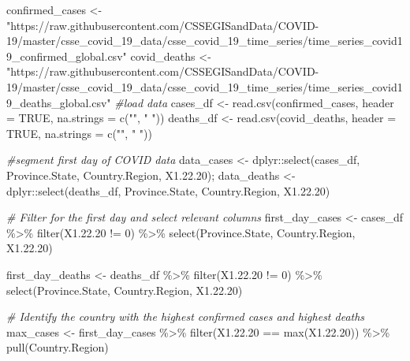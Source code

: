 \documentclass[
]{article}
\newenvironment{Shaded}{\begin{snugshade}}{\end{snugshade}}
\newcommand{\AttributeTok}[1]{\textcolor[rgb]{0.77,0.63,0.00}{#1}}
\newcommand{\CommentTok}[1]{\textcolor[rgb]{0.56,0.35,0.01}{\textit{#1}}}
\newcommand{\ConstantTok}[1]{\textcolor[rgb]{0.00,0.00,0.00}{#1}}
\newcommand{\DecValTok}[1]{\textcolor[rgb]{0.00,0.00,0.81}{#1}}
\newcommand{\FloatTok}[1]{\textcolor[rgb]{0.00,0.00,0.81}{#1}}
\newcommand{\FunctionTok}[1]{\textcolor[rgb]{0.00,0.00,0.00}{#1}}
\newcommand{\NormalTok}[1]{#1}
\newcommand{\OtherTok}[1]{\textcolor[rgb]{0.56,0.35,0.01}{#1}}
\newcommand{\SpecialCharTok}[1]{\textcolor[rgb]{0.00,0.00,0.00}{#1}}
\newcommand{\StringTok}[1]{\textcolor[rgb]{0.31,0.60,0.02}{#1}}
\begin{document}
\begin{Shaded}
\begin{Highlighting}[]
\NormalTok{confirmed\_cases }\OtherTok{\textless{}{-}} \StringTok{"https://raw.githubusercontent.com/CSSEGISandData/COVID{-}19/master/csse\_covid\_19\_data/csse\_covid\_19\_time\_series/time\_series\_covid19\_confirmed\_global.csv"}
\NormalTok{covid\_deaths }\OtherTok{\textless{}{-}} \StringTok{"https://raw.githubusercontent.com/CSSEGISandData/COVID{-}19/master/csse\_covid\_19\_data/csse\_covid\_19\_time\_series/time\_series\_covid19\_deaths\_global.csv"}
\CommentTok{\#load data}
\NormalTok{cases\_df }\OtherTok{\textless{}{-}} \FunctionTok{read.csv}\NormalTok{(confirmed\_cases, }\AttributeTok{header =} \ConstantTok{TRUE}\NormalTok{, }\AttributeTok{na.strings =} \FunctionTok{c}\NormalTok{(}\StringTok{""}\NormalTok{, }\StringTok{" "}\NormalTok{))}
\NormalTok{deaths\_df }\OtherTok{\textless{}{-}} \FunctionTok{read.csv}\NormalTok{(covid\_deaths, }\AttributeTok{header =} \ConstantTok{TRUE}\NormalTok{, }\AttributeTok{na.strings =} \FunctionTok{c}\NormalTok{(}\StringTok{""}\NormalTok{, }\StringTok{" "}\NormalTok{))}

\CommentTok{\#segment first day of COVID data}
\NormalTok{data\_cases }\OtherTok{\textless{}{-}}\NormalTok{ dplyr}\SpecialCharTok{::}\FunctionTok{select}\NormalTok{(cases\_df, Province.State, Country.Region, X1.}\FloatTok{22.20}\NormalTok{); }
\NormalTok{data\_deaths }\OtherTok{\textless{}{-}}\NormalTok{ dplyr}\SpecialCharTok{::}\FunctionTok{select}\NormalTok{(deaths\_df, Province.State, Country.Region, X1.}\FloatTok{22.20}\NormalTok{)}

\CommentTok{\# Filter for the first day and select relevant columns}
\NormalTok{first\_day\_cases }\OtherTok{\textless{}{-}}\NormalTok{ cases\_df }\SpecialCharTok{\%\textgreater{}\%}
  \FunctionTok{filter}\NormalTok{(X1.}\FloatTok{22.20} \SpecialCharTok{!=} \DecValTok{0}\NormalTok{) }\SpecialCharTok{\%\textgreater{}\%}
  \FunctionTok{select}\NormalTok{(Province.State, Country.Region, X1.}\FloatTok{22.20}\NormalTok{)}

\NormalTok{first\_day\_deaths }\OtherTok{\textless{}{-}}\NormalTok{ deaths\_df }\SpecialCharTok{\%\textgreater{}\%}
  \FunctionTok{filter}\NormalTok{(X1.}\FloatTok{22.20} \SpecialCharTok{!=} \DecValTok{0}\NormalTok{) }\SpecialCharTok{\%\textgreater{}\%}
  \FunctionTok{select}\NormalTok{(Province.State, Country.Region, X1.}\FloatTok{22.20}\NormalTok{)}

\CommentTok{\# Identify the country with the highest confirmed cases and highest deaths}
\NormalTok{max\_cases }\OtherTok{\textless{}{-}}\NormalTok{ first\_day\_cases }\SpecialCharTok{\%\textgreater{}\%}
  \FunctionTok{filter}\NormalTok{(X1.}\FloatTok{22.20} \SpecialCharTok{==} \FunctionTok{max}\NormalTok{(X1.}\FloatTok{22.20}\NormalTok{)) }\SpecialCharTok{\%\textgreater{}\%}
  \FunctionTok{pull}\NormalTok{(Country.Region)}


\end{Highlighting}
\end{Shaded}
\end{document}
